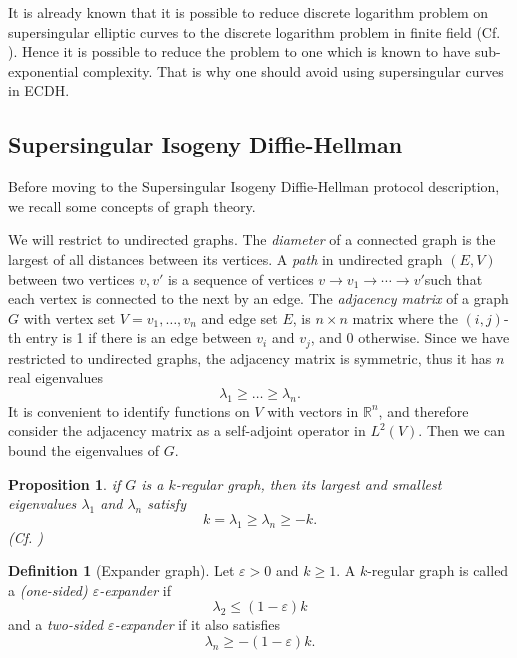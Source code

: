 \documentclass{article}
\theoremstyle{theorem}
\newtheorem{proposition}{Proposition}
\theoremstyle{definition}
\newtheorem{definition}{Definition}
\begin{document}
It is already known that it is possible to reduce discrete logarithm problem on supersingular elliptic curves to the discrete logarithm problem in finite field (Cf. \cite{MOV}). Hence it is possible to reduce the problem to one which is known to have sub-exponential complexity. That is why one should avoid using supersingular curves in ECDH.

\subsection{Supersingular Isogeny Diffie-Hellman}


Before moving to the Supersingular Isogeny Diffie-Hellman protocol description, we recall some concepts of graph theory.

We will restrict to undirected graphs. The \textit{diameter} of a connected graph is the largest of all distances between its vertices. A \textit{path} in undirected graph $(E, V)$ between two vertices $v, v'$ is a sequence of vertices $v \to v_1 \to \cdots \to v'$such that each vertex is connected to the next  by an edge. The \textit{adjacency matrix} of a graph $G$ with vertex set $V = {v_1, \dots, v_n}$ and edge set $E$, is $n \times n$ matrix where the $(i, j)$-th entry is 1 if there is an edge between $v_i$ and $v_j$, and 0 otherwise. Since we have restricted to undirected graphs, the adjacency matrix is symmetric, thus it has $n$ real eigenvalues
	\[ \lambda_1 \geq \dots \geq \lambda_n. \]
It is convenient to identify functions on $V$ with vectors in $\mathbb{R}^n$, and therefore consider the adjacency matrix as a self-adjoint operator in $L^2(V)$. Then we can bound the eigenvalues of $G$.

\begin{proposition}
	if $G$ is a $k$-regular graph, then its largest and smallest eigenvalues $\lambda_1$ and $\lambda_n$ satisfy
		\[ k = \lambda_1 \geq \lambda_n \geq -k. \]
		(Cf. \cite{Tao})
\end{proposition}

\begin{definition}[Expander graph]
	Let $\varepsilon > 0$ and $k \geq 1$. A $k$-regular graph is called a \textit{(one-sided) $\varepsilon$-expander} if
		\[ \lambda_2 \leq (1 - \varepsilon)k \]
	and a \textit{two-sided $\varepsilon$-expander} if it also satisfies
		\[ \lambda_n \geq -(1 - \varepsilon)k. \]
\end{definition}
\end{document}

